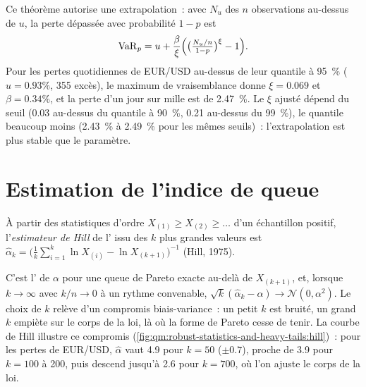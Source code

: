 Ce théorème autorise une extrapolation~: avec $N_u$ des $n$ observations au-dessus de $u$, la perte dépassée avec probabilité $1 - p$ est
\[
\mathrm{VaR}_p = u + \frac\beta\xi\Bigl(\bigl(\tfrac{N_u/n}{1 - p}\bigr)^\xi - 1\Bigr).
\]
Pour les pertes quotidiennes de EUR/USD au-dessus de leur quantile à 95~\% ($u = 0.93\%$, 355 excès), le maximum de vraisemblance donne $\xi = 0.069$ et $\beta = 0.34\%$,
et la perte d'un jour sur mille est de 2.47~\%. Le $\xi$ ajusté dépend du seuil (0.03 au-dessus du quantile à 90~\%, 0.21 au-dessus du
99~\%), le quantile beaucoup moins (2.43~\% à 2.49~\% pour les mêmes seuils)~: l'extrapolation est plus stable que le paramètre.

\section{Estimation de l'indice de queue}

\begin{definition}\label{def:qm:robust-statistics-and-heavy-tails:hill}
À partir des statistiques d'ordre $X_{(1)} \ge X_{(2)} \ge \dots$ d'un échantillon positif, l'\emph{estimateur de Hill} de l'
issu des $k$ plus grandes valeurs est $\hat\alpha_k = \bigl(\frac1k\sum_{i=1}^k\ln X_{(i)} - \ln X_{(k+1)}\bigr)^{-1}$ (Hill, 1975).
\end{definition}

C'est l' de $\alpha$ pour une queue de Pareto exacte au-delà de $X_{(k+1)}$, et, lorsque $k \to \infty$ avec $k/n \to 0$ à un
rythme convenable, $\sqrt k(\hat\alpha_k - \alpha) \to \mathcal N(0, \alpha^2)$. Le choix de $k$ relève d'un compromis biais-variance~: un petit $k$ est bruité,
un grand $k$ empiète sur le corps de la loi, là où la forme de Pareto cesse de tenir. La courbe de Hill illustre ce compromis
(\cref{fig:qm:robust-statistics-and-heavy-tails:hill})~: pour les pertes de EUR/USD, $\hat\alpha$ vaut 4.9 pour $k = 50$ ($\pm 0.7$), proche de 3.9 pour $k =
100$ à 200, puis descend jusqu'à 2.6 pour $k = 700$, où l'on ajuste le corps de la loi.

